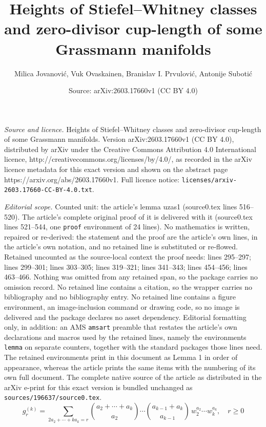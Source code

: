 \documentclass[10pt,a4paper]{amsart}
\title{Heights of Stiefel--Whitney classes and zero-divisor cup-length of some Grassmann manifolds}
\author{Milica Jovanovi\'c, Vuk Ovaskainen, Branislav I. Prvulovi\'c, Antonije Suboti\'c}
\date{Source: arXiv:2603.17660v1 (CC BY 4.0)}
\renewcommand{\ge}{\geqslant}
\begin{document}
\maketitle

\noindent\emph{Source and licence.} Heights of Stiefel--Whitney classes and zero-divisor cup-length of some Grassmann manifolds. Version arXiv:2603.17660v1 (CC BY 4.0), distributed by arXiv under the Creative Commons Attribution 4.0 International licence, http://creativecommons.org/licenses/by/4.0/, as recorded in the arXiv licence metadata for this exact version and shown on the abstract page https://arxiv.org/abs/2603.17660v1. Full licence notice: \texttt{licenses/arxiv-2603.17660-CC-BY-4.0.txt}.\par\smallskip

\noindent\textit{Editorial scope.} Counted unit: the article's lemma uzas1 (source0.tex lines 516--520). The article's complete original proof of it is delivered with it (source0.tex lines 521--544, one \texttt{proof} environment of 24 lines). No mathematics is written, repaired or re-derived: the statement and the proof are the article's own lines, in the article's own notation, and no retained line is substituted or re-flowed.  Retained uncounted as the source-local context the proof needs: lines 295--297; lines 299--301; lines 303--305; lines 319--321; lines 341--343; lines 454--456; lines 463--466.  Nothing was omitted from any retained span, so the package carries no omission record.  No retained line contains a citation, so the wrapper carries no bibliography and no bibliography entry.  No retained line contains a figure environment, an image-inclusion command or drawing code, so no image is delivered and the package declares no asset dependency.  Editorial formatting only, in addition: an AMS \texttt{amsart} preamble that restates the article's own declarations and macros used by the retained lines, namely the environments \texttt{lemma} on separate counters, together with the standard packages those lines need.  The retained environments print in this document as Lemma 1 in order of appearance, whereas the article prints the same items with the numbering of its own full document.  The complete native source of the article as distributed in the arXiv e-print for this exact version is bundled unchanged as \texttt{sources/196637/source0.tex}.
	\begin{equation}\label{eq_explicitly_g}
		g_r^{(k)} = \sum_{2a_2+\cdots +ka_k = r} \binom{a_2+\cdots +a_k}{a_2}\cdots\binom{a_{k-1} + a_k}{a_{k-1}}\,  w_2^{a_2}\cdots w_k^{a_k},\quad r\ge0
	\end{equation}
\end{document}
